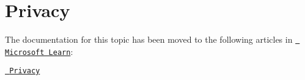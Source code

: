 \chapter{Privacy}
\hypertarget{md_external_2reflect-cpp_2vcpkg_2docs_2about_2privacy}{}\label{md_external_2reflect-cpp_2vcpkg_2docs_2about_2privacy}
\label{md_external_2reflect-cpp_2vcpkg_2docs_2about_2privacy_autotoc_md756}%
%


The documentation for this topic has been moved to the following articles in \href{https://learn.microsoft.com/vcpkg}{\texttt{ Microsoft Learn}}\+:


\begin{DoxyItemize}
\item \href{https://learn.microsoft.com/vcpkg/about/privacy}{\texttt{ Privacy}} 
\end{DoxyItemize}